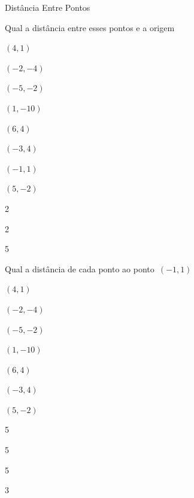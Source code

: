\begin{exercicios}{Distância Entre Pontos}
    \begin{exercicio}
        Qual a distância entre esses pontos e a origem
        \begin{alphalist}[3]
            \item $(4,1)$
            \item $(-2,-4)$
            \item $(-5,-2)$
            \item $(1,-10)$
            \item $(6,4)$
            \item $(-3,4)$
            \item $(-1,1)$
            \item $(5,-2)$
        \end{alphalist}
        \begin{answers}
            \begin{mathlist}[4]
                \item {}
                \item 2 
                \item {}
                \item {}
                \item 2 
                \item 5
                \item {}
                \item {}
            \end{mathlist}
        \end{answers}
    \end{exercicio}
        
    \begin{exercicio}
        Qual a distância de cada ponto ao ponto~$(-1,1)$
        \begin{alphalist}[3]
            \item $(4,1)$
            \item $(-2,-4)$
            \item $(-5,-2)$
            \item $(1,-10)$
            \item $(6,4)$
            \item $(-3,4)$
            \item $(5,-2)$
        \end{alphalist}
        \begin{answers}
            \begin{mathlist}[4]
                \item 5
                \item {}
                \item 5
                \item 5 
                \item {}
                \item {}
                \item 3 
            \end{mathlist}
        \end{answers}
    \end{exercicio}
    

\end{exercicios}
